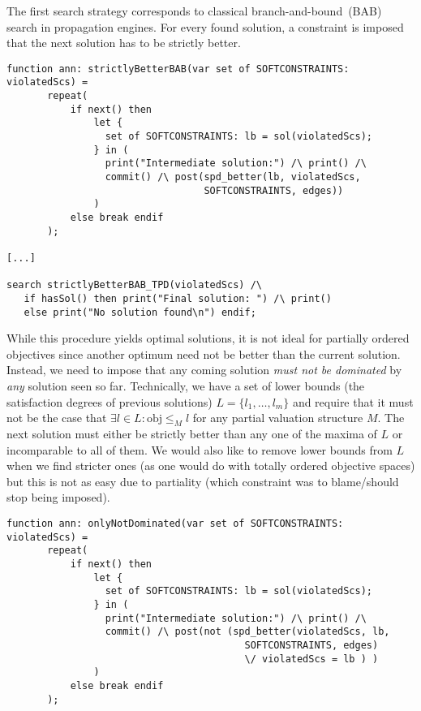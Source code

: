 The first search strategy corresponds to classical branch-and-bound~(BAB) search
in propagation engines. For every found solution, a constraint is imposed that 
the next solution has to be strictly better.

\begin{lstlisting}
function ann: strictlyBetterBAB(var set of SOFTCONSTRAINTS: violatedScs) =
       repeat(
           if next() then
               let {
                 set of SOFTCONSTRAINTS: lb = sol(violatedScs); 
               } in (
                 print("Intermediate solution:") /\ print() /\
                 commit() /\ post(spd_better(lb, violatedScs, 
                                  SOFTCONSTRAINTS, edges))
               )
           else break endif
       );
       
[...]
       
search strictlyBetterBAB_TPD(violatedScs) /\ 
   if hasSol() then print("Final solution: ") /\ print() 
   else print("No solution found\n") endif;
\end{lstlisting}

While this procedure yields optimal solutions, it is not ideal for partially ordered objectives since 
another optimum need not be better than the current solution. Instead, we need to impose that any coming 
solution \emph{must not be dominated} by \emph{any} solution seen so far. Technically,
we have a set of lower bounds (the satisfaction degrees of previous solutions) $L = \{l_1, \ldots, l_m \}$ and
require that it must not be the case that $\exists l \in L : \mathrm{obj} \leq_M l$ for any partial valuation
structure $M$. The next solution must either be strictly better than any one of the maxima of $L$ or incomparable to
all of them. We would also like to remove lower bounds from $L$ when we find stricter ones (as one would do with
totally ordered objective spaces) but this is not as easy due to partiality (which constraint was to blame/should
stop being imposed).

\begin{lstlisting}
function ann: onlyNotDominated(var set of SOFTCONSTRAINTS: violatedScs) =
       repeat(
           if next() then
               let {
                 set of SOFTCONSTRAINTS: lb = sol(violatedScs); 
               } in (
                 print("Intermediate solution:") /\ print() /\
                 commit() /\ post(not (spd_better(violatedScs, lb, 
                                         SOFTCONSTRAINTS, edges) 
                                         \/ violatedScs = lb ) )
               )
           else break endif
       );
\end{lstlisting}

